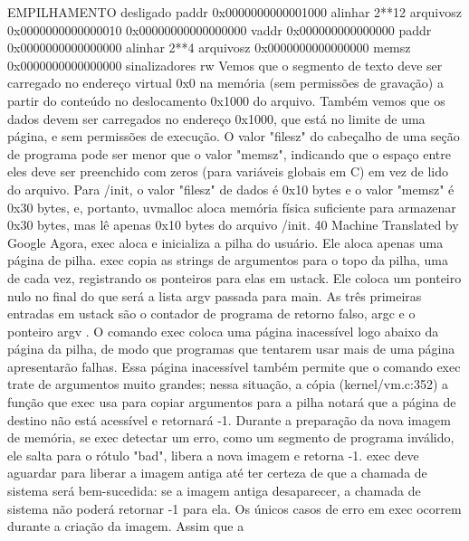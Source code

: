 EMPILHAMENTO  desligado
 paddr  0x0000000000001000  alinhar  2**12  arquivosz  0x0000000000000010  
0x00000000000000000  vaddr  0x000000000000000  paddr  0x0000000000000000  
alinhar  2**4  arquivosz  0x0000000000000000  memsz  
0x0000000000000000  sinalizadores  rw
Vemos  que  o  segmento  de  texto  deve  ser  carregado  no  endereço  virtual  0x0  na  memória  (sem  permissões  de  
gravação)  a  partir  do  conteúdo  no  deslocamento  0x1000  do  arquivo.  Também  vemos  que  os  dados  devem  ser  carregados  
no  endereço  0x1000,  que  está  no  limite  de  uma  página,  e  sem  permissões  de  execução.
 O  valor  "filesz"  do  cabeçalho  de  uma  seção  de  programa  pode  ser  menor  que  o  valor  "memsz",  indicando  que  o  
espaço  entre  eles  deve  ser  preenchido  com  zeros  (para  variáveis  globais  em  C)  em  vez  de  lido  do  arquivo.  Para /init,  o  
valor  "filesz"  de  dados  é  0x10  bytes  e  o  valor  "memsz"  é  0x30  bytes,  e,  portanto,  uvmalloc  aloca  memória  física  suficiente  
para  armazenar  0x30  bytes,  mas  lê  apenas  0x10  bytes  do  arquivo /init.
 40
Machine Translated by Google
 Agora,  exec  aloca  e  inicializa  a  pilha  do  usuário.  Ele  aloca  apenas  uma  página  de  pilha.  exec  copia  as  strings  de  
argumentos  para  o  topo  da  pilha,  uma  de  cada  vez,  registrando  os  ponteiros  para  elas  em  ustack.
 Ele  coloca  um  ponteiro  nulo  no  final  do  que  será  a  lista  argv  passada  para  main.  As  três  primeiras  entradas  em  ustack  são  
o  contador  de  programa  de  retorno  falso,  argc  e  o  ponteiro  argv .
 O  comando  exec  coloca  uma  página  inacessível  logo  abaixo  da  página  da  pilha,  de  modo  que  programas  que  tentarem  
usar  mais  de  uma  página  apresentarão  falhas.  Essa  página  inacessível  também  permite  que  o  comando  exec  trate  de  
argumentos  muito  grandes;  nessa  situação,  a  cópia  (kernel/vm.c:352)  a  função  que  exec  usa  para  copiar  argumentos  para  
a  pilha  notará  que  a  página  de  destino  não  está  acessível  e  retornará  -1.
 Durante  a  preparação  da  nova  imagem  de  memória,  se  exec  detectar  um  erro,  como  um  segmento  de  programa  
inválido,  ele  salta  para  o  rótulo  "bad",  libera  a  nova  imagem  e  retorna  -1.  exec  deve  aguardar  para  liberar  a  imagem  antiga  
até  ter  certeza  de  que  a  chamada  de  sistema  será  bem-sucedida:  se  a  imagem  antiga  desaparecer,  a  chamada  de  sistema  
não  poderá  retornar  -1  para  ela.  Os  únicos  casos  de  erro  em  exec  ocorrem  durante  a  criação  da  imagem.  Assim  que  a  
